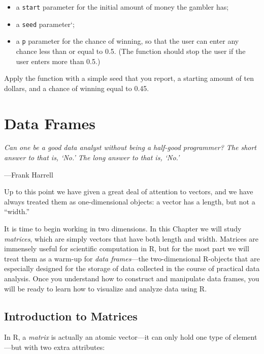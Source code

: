 \documentclass[]{book}
\providecommand{\tightlist}{%
  \setlength{\itemsep}{0pt}\setlength{\parskip}{0pt}}
\theoremstyle{definition}
\theoremstyle{definition}
\theoremstyle{remark}
\let\BeginKnitrBlock\begin \let\EndKnitrBlock\end
\begin{document}
{\begin{enumerate}
  \begin{itemize}
  \tightlist
  \item
    a \texttt{start} parameter for the initial amount of money the
    gambler has;
  \item
    a \texttt{seed} parameter`;
  \item
    a \texttt{p} parameter for the chance of winning, so that the user
    can enter any chance less than or equal to 0.5. (The function should
    stop the user if the user enters more than 0.5.)
  \end{itemize}

  Apply the function with a simple seed that you report, a starting
  amount of ten dollars, and a chance of winning equal to 0.45.
\end{enumerate}

\chapter{Data Frames}\label{frames}

\BeginKnitrBlock{leadquote}
\emph{Can one be a good data analyst without being a half-good
programmer? The short answer to that is, `No.' The long answer to that
is, `No.'}

---Frank Harrell
\EndKnitrBlock{leadquote}

Up to this point we have given a great deal of attention to vectors, and
we have always treated them as one-dimensional objects: a vector has a
length, but not a ``width.''

It is time to begin working in two dimensions. In this Chapter we will
study \emph{matrices}, which are simply vectors that have both length
and width. Matrices are immensely useful for scientific computation in
R, but for the most part we will treat them as a warm-up for \emph{data
frames}---the two-dimensional R-objects that are especially designed for
the storage of data collected in the course of practical data analysis.
Once you understand how to construct and manipulate data frames, you
will be ready to learn how to visualize and analyze data using R.

\newpage

\section{Introduction to Matrices}\label{introduction-to-matrices}

In R, a \emph{matrix}  is actually an atomic vector---it
can only hold one type of element---but with two extra attributes:

}
\end{document}
